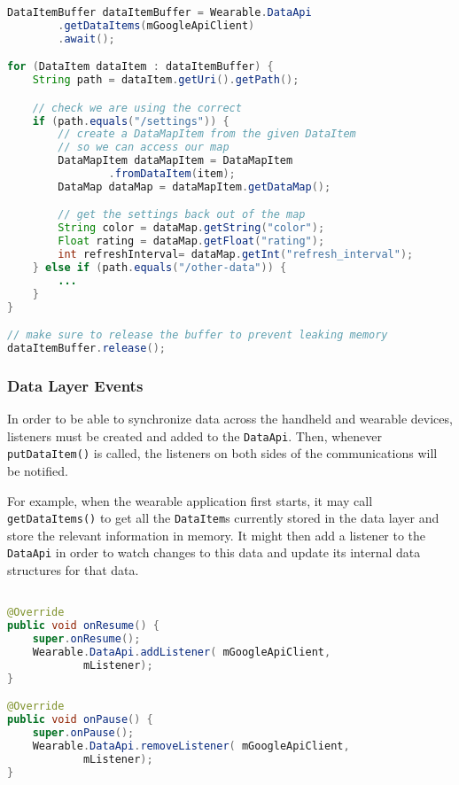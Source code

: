 \begin{lstlisting}[language=Java]
DataItemBuffer dataItemBuffer = Wearable.DataApi
        .getDataItems(mGoogleApiClient)
        .await();

for (DataItem dataItem : dataItemBuffer) {
    String path = dataItem.getUri().getPath();

    // check we are using the correct 
    if (path.equals("/settings")) {
        // create a DataMapItem from the given DataItem
        // so we can access our map
        DataMapItem dataMapItem = DataMapItem
                .fromDataItem(item);
        DataMap dataMap = dataMapItem.getDataMap();

        // get the settings back out of the map
        String color = dataMap.getString("color");
        Float rating = dataMap.getFloat("rating");
        int refreshInterval= dataMap.getInt("refresh_interval");
    } else if (path.equals("/other-data")) {
        ...
    }
}

// make sure to release the buffer to prevent leaking memory
dataItemBuffer.release();
\end{lstlisting}


\subsubsection{Data Layer Events}

In order to be able to synchronize data across the handheld and wearable
devices, listeners must be created and added to the \texttt{DataApi}. Then, 
whenever \texttt{putDataItem()} is called, the listeners on both sides of the
communications will be notified.

For example, when the wearable application first starts, it may call
\texttt{getDataItems()} to get all the \texttt{DataItem}s currently stored in
the data layer and store the relevant information in memory. It might then add
a listener to the \texttt{DataApi} in order to watch changes to this data and
update its internal data structures for that data.

\begin{lstlisting}[language=Java]

@Override
public void onResume() {
    super.onResume();
    Wearable.DataApi.addListener( mGoogleApiClient,
            mListener);
}

@Override
public void onPause() {
    super.onPause();
    Wearable.DataApi.removeListener( mGoogleApiClient,
            mListener);
}

\end{lstlisting}


